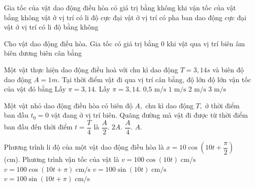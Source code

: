 \begin{ex}
	Gia tốc của vật dao động điều hòa có giá trị bằng không khi
	\choice
	{vận tốc của vật bằng không}
	{vật ở vị trí có li độ cực đại}
	{vật ở vị trí có pha ban dao động cực đại}
	{\True vật ở vị trí có li độ bằng không}
\end{ex}

\begin{ex}
	Cho vật dao động điều hòa. Gia tốc có giá trị bằng $0$ khi vật qua vị trí
	\choice
	{biên âm}
	{biên dương}
	{biên}
	{\True cân bằng}
\end{ex}

\begin{ex}
	Một vật thực hiện dao động điều hoà với chu kì dao động $T=3,14s$ và biên độ dao động $A=1m.$ Tại thời điểm vật đi qua vị trí cân bằng, độ lớn độ lớn vận tốc của vật đó bằng Lấy $\pi=3,14$. Lấy $\pi=3,14$.
	\choice
	{$\text{0,5 m/s}\text{}$}
	{$1\text{ m/s}\text{}$}
	{\True $2\text{ m/s}\text{}$}
	{$3\text{ m/s}\text{}$}
\end{ex}

\begin{ex}
	Một vật nhỏ dao động điều hòa có biên độ $A,$ chu kì dao động $T,$ ở thời điểm ban đầu ${{t}_{0}}=0$ vật đang ở vị trí biên. Quãng đường mà vật đi được từ thời điểm ban đầu đến thời điểm $t=\dfrac{T}{4}$ là
	\choice
	{$\dfrac{A}{2}.$}
	{$2A.$}
	{$\dfrac{A}{4}.$}
	{\True $A.$}
\end{ex}

\begin{ex}
	Phương trình li độ của một vật dao động điều hòa là $x=10\cos\left(10t+\dfrac{\pi}{2}\right)$ (cm). Phương trình vận tốc của vật là
	\choice
	{$v=100\cos(10t)\;\mathrm{cm/s}$}
	{\True $v=100\cos(10t+\pi)\;\mathrm{cm/s}$}
	{$v=100\sin(10t)\;\mathrm{cm/s}$}
	{$v=100\sin(10t+\pi)\;\mathrm{cm/s}$}
	\loigiai{
		\[
		v=x'=-100\sin\left(10t+\dfrac{\pi}{2}\right)
		=-100\cos(10t)
		=100\cos(10t+\pi)\;\mathrm{cm/s}.
		\]
	}
\end{ex}

